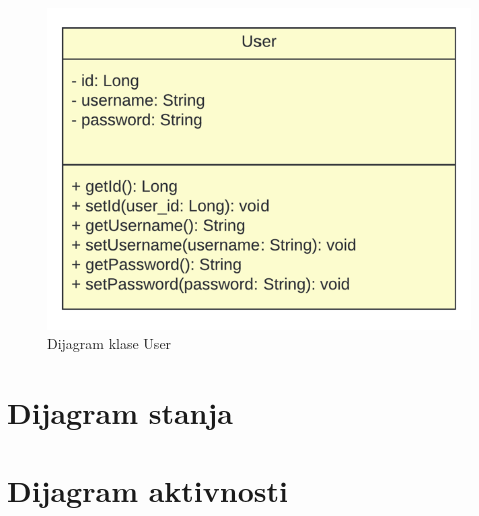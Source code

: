 		   \begin{figure}[H]
				\includegraphics[width=\textwidth]{slike/DijagramKlaseUser.png} 
				\caption{Dijagram klase User} 
	   		\end{figure}
			
			
			
			
			
			\eject
		
		\section{Dijagram stanja}
			
			
			
			
			
			\eject 
		
		\section{Dijagram aktivnosti}
			
